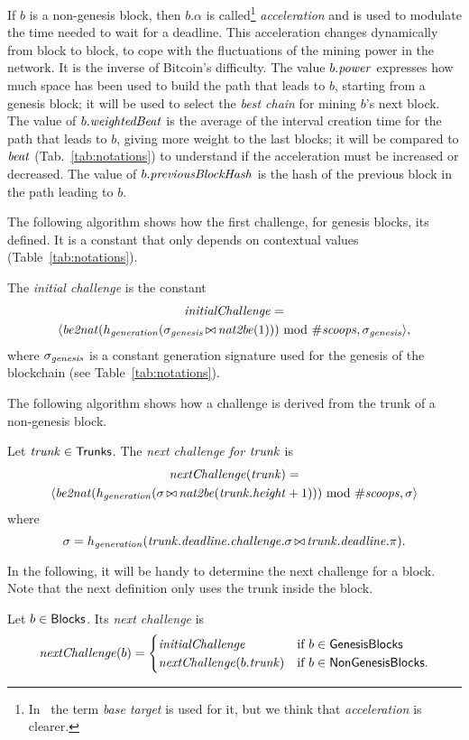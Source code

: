 If $b$ is a non-genesis block, then
$b.\alpha$ is called\footnote{In~\cite{SignumPlotting} the term
\emph{base target} is used for it, but we think that \emph{acceleration} is clearer.}
\emph{acceleration} and is used to modulate the time needed to wait for a deadline.
This acceleration changes dynamically from block to block, to cope with
the fluctuations of the mining power in the network. It is the inverse of Bitcoin's difficulty.
The value $b.{\mathit{power}}$ expresses how much space has been used to build the path that leads to $b$,
starting from a genesis block; it will be used to select the \emph{best chain} for mining
$b$'s next block. The value of $b.{\mathit{weightedBeat}}$ is the average of the interval creation time
for the path that leads to $b$, giving more weight to the last blocks; it will be
compared to ${\mathit{beat}}$ (Tab.~\ref{tab:notations}) to understand if the acceleration
must be increased or decreased.
The value of $b.{\mathit{previousBlockHash}}$ is the hash of the previous block in the path leading to $b$.

The following algorithm shows how the first challenge, for genesis blocks,
its defined. It is a constant that only depends on contextual values (Table~\ref{tab:notations}).
%
\begin{alg}[$\initialchallenge$]\label{alg:initial_challenge}
  The \emph{initial challenge} is the constant
  \begin{multline*}
    {\mathit{initialChallenge}}=\\
    \langle{\mathit{be2nat}}(h_{\mathit{generation}}(\sigma_{\mathit{genesis}}\operatorname*{\bowtie}{\mathit{nat2be}}(1)))\text{ mod }{\#\mathit{scoops}},\sigma_{\mathit{genesis}}\rangle,
  \end{multline*}
  where $\sigma_{\mathit{genesis}}$ is a constant generation signature used for the genesis of the blockchain
  (see Table~\ref{tab:notations}).
\end{alg}
%
The following algorithm shows how a challenge is derived from the trunk of a non-genesis block.
%
\begin{alg}[$\nextchallenge(\trunk)$]\label{alg:next_challenge_from_trunk}
  Let ${\mathit{trunk}}\in{\mathsf{Trunks}}$. The \emph{next challenge for ${\mathit{trunk}}$} is
  \begin{multline*}
    {\mathit{nextChallenge}}({\mathit{trunk}})=\\
    \langle{\mathit{be2nat}}(h_{\mathit{generation}}(\sigma\operatorname*{\bowtie}{\mathit{nat2be}}({\mathit{trunk}}.{\mathit{height}}+1)))\text{ mod }{\#\mathit{scoops}},\sigma\rangle
  \end{multline*}
  where
  \[
  \sigma=h_{\mathit{generation}}({\mathit{trunk}}.{\mathit{deadline}}.{\mathit{challenge}}.\sigma\operatorname*{\bowtie}{\mathit{trunk}}.{\mathit{deadline}}.\pi).  
  \]
\end{alg}
%
In the following, it will be handy to determine the next challenge for a block. Note that
the next definition only uses the trunk inside the block.
%
\begin{definition}\label{def:next_challenge_from_block}
  Let $b\in{\mathsf{Blocks}}$. Its \emph{next challenge} is
  \[
  {\mathit{nextChallenge}}(b)=\begin{cases}
  {\mathit{initialChallenge}} & \text{if $b\in{\mathsf{GenesisBlocks}}$}\\
  {\mathit{nextChallenge}}(b.{\mathit{trunk}}) & \text{if $b\in{\mathsf{NonGenesisBlocks}}$.}
  \end{cases}
  \]
\end{definition}


